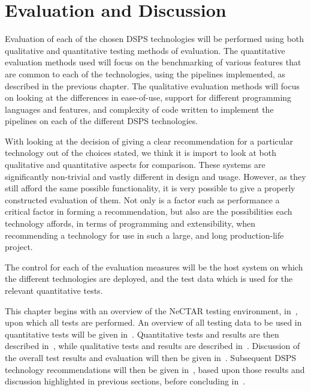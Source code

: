 \chapter{Evaluation and Discussion}
\label{sec:evaluation}

Evaluation of each of the chosen DSPS technologies will be performed using both qualitative and quantitative testing methods
of evaluation. The quantitative evaluation methods used will focus on the benchmarking of various features that are common
to each of the technologies, using the pipelines implemented, as described in the previous chapter.
The qualitative evaluation methods will focus on looking at the differences in ease-of-use,
support for different programming languages and features, and complexity of code written to implement the pipelines on
each of the different DSPS technologies.

With looking at the decision of giving a clear recommendation for a particular technology out of the choices stated,
we think it is import to look at both qualitative and quantitative aspects for comparison. These systems are significantly
non-trivial and vastly different in design and usage. However, as they still afford the same possible functionality,
it is very possible to give a properly constructed evaluation of them. Not only is a factor such as performance a critical
factor in forming a recommendation, but also are the possibilities each technology affords, in terms of programming and
extensibility, when recommending a technology for use in such a large, and long production-life project.

The control for each of the evaluation measures will be the host system on which the different technologies are deployed,
and the test data which is used for the relevant quantitative tests.

This chapter begins with an overview of the NeCTAR testing environment, in~, upon which
all tests are performed. An overview of all testing data to be used in quantitative tests will be given in~.
Quantitative tests and results are then described in~,
while qualitative tests and results are described in~. Discussion of the
overall test results and evaluation will then be given in~. Subsequent DSPS technology recommendations will then be given in~,
based upon those results and discussion highlighted in previous sections, before concluding in~.


